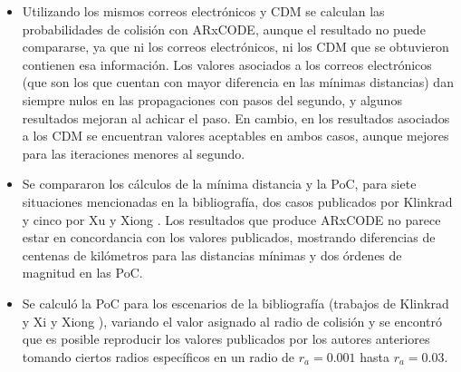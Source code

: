 \begin{itemize}
  \item Utilizando los mismos correos electr\'onicos y CDM se calculan las probabilidades de colisi\'on con ARxCODE, aunque el resultado no puede compararse, ya que ni los correos electr\'onicos, ni los CDM que se obtuvieron contienen esa informaci\'on. Los valores asociados a los correos electr\'onicos (que son los que cuentan con mayor diferencia en las m\'inimas distancias) dan siempre nulos en las propagaciones con pasos del segundo, y algunos resultados mejoran al achicar el paso. En cambio, en los resultados asociados a los CDM se encuentran valores aceptables en ambos casos, aunque mejores para las iteraciones menores al segundo.\\
  \item Se compararon los c\'alculos de la m\'inima distancia y la PoC, para siete situaciones mencionadas en la bibliograf\'ia, dos casos publicados por Klinkrad \citep{Klinkrad} y cinco por Xu y Xiong \citep{xu2014method}. Los resultados que produce ARxCODE no parece estar en concordancia con los valores publicados, mostrando diferencias de centenas de kil\'ometros para las distancias m\'inimas y dos \'ordenes de magnitud en las PoC.
  \item Se calcul\'o la PoC para los escenarios de la bibliograf\'ia (trabajos de Klinkrad \citep{Klinkrad} y Xi y Xiong \citep{xu2014method}), variando el valor asignado al radio de colisi\'on y se encontr\'o que es posible reproducir los valores publicados por los autores anteriores tomando ciertos radios espec\'ificos en un radio de $r_{a}=0.001$ hasta $r_{a}=0.03$.\\
 \end{itemize}
